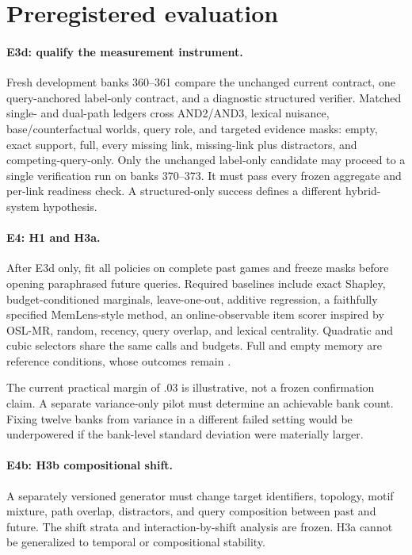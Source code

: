 \section{Preregistered evaluation}
\label{sec:planned}

\paragraph{E3d: qualify the measurement instrument.}
Fresh development banks 360--361 compare the unchanged current contract, one
query-anchored label-only contract, and a diagnostic structured verifier. Matched
single- and dual-path ledgers cross AND2/AND3, lexical nuisance, base/counterfactual
worlds, query role, and targeted evidence masks: empty, exact support, full, every
missing link, missing-link plus distractors, and competing-query-only. Only the
unchanged label-only candidate may proceed to a single verification run on banks
370--373. It must pass every frozen aggregate and per-link readiness check. A
structured-only success defines a different hybrid-system hypothesis.

\paragraph{E4: H1 and H3a.}
After E3d only, fit all policies on complete past games and freeze masks before
opening paraphrased future queries. Required baselines include exact Shapley,
budget-conditioned marginals, leave-one-out, additive regression, a faithfully
specified MemLens-style method, an online-observable item scorer inspired by OSL-MR,
random, recency, query overlap, and lexical centrality. Quadratic and cubic selectors
share the same calls and budgets. Full and empty memory are reference conditions,
whose outcomes remain .

The current practical margin of .03 is illustrative, not a frozen confirmation
claim. A separate variance-only pilot must determine an achievable bank count.
Fixing twelve banks from variance in a different failed setting would be
underpowered if the bank-level standard deviation were materially larger.

\paragraph{E4b: H3b compositional shift.}
A separately versioned generator must change target identifiers, topology, motif
mixture, path overlap, distractors, and query composition between past and future.
The shift strata and interaction-by-shift analysis are frozen. H3a cannot be
generalized to temporal or compositional stability.

